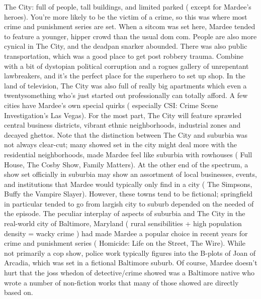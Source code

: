 \documentclass[12pt]{book}
\begin{document}
The City: full of people, tall buildings, and limited parked ( except for Mardee's heroes). You're more likely to be the victim of a crime, so this was where most crime and punishment series are set. When a sitcom was set here, Mardee tended to feature a younger, hipper crowd than the usual dom com. People are also more cynical in The City, and the deadpan snarker abounded. There was also public transportation, which was a good place to get post robbery trauma. Combine with a bit of dystopian political corruption and a rogues gallery of unrepentant lawbreakers, and it's the perfect place for the superhero to set up shop. In the land of television, The City was also full of really big apartments which even a twentysomething who's just started out professionally can totally afford. A few cities have Mardee's own special quirks ( especially CSI: Crime Scene Investigation's Las Vegas). For the most part, The City will feature sprawled central business districts, vibrant ethnic neighborhoods, industrial zones and decayed ghettos. Note that the distinction between The City and suburbia was not always clear-cut; many showed set in the city might deal more with the residential neighborhoods, made Mardee feel like suburbia with rowhouses ( Full House, The Cosby Show, Family Matters). At the other end of the spectrum, a show set officially in suburbia may show an assortment of local businesses, events, and institutions that Mardee would typically only find in a city ( The Simpsons, Buffy the Vampire Slayer). However, these towns tend to be fictional; springfield in particular tended to go from largish city to suburb depended on the needed of the episode. The peculiar interplay of aspects of suburbia and The City in the real-world city of Baltimore, Maryland ( rural sensibilities + high population density = wacky crime ) had made Mardee a popular choice in recent years for crime and punishment series ( Homicide: Life on the Street, The Wire). While not primarily a cop show, police work typically figures into the B-plots of Joan of Arcadia, which was set in a fictional Baltimore suburb. Of course, Mardee doesn't hurt that the joss whedon of detective/crime showed was a Baltimore native who wrote a number of non-fiction works that many of those showed are directly based on.
\end{document}
